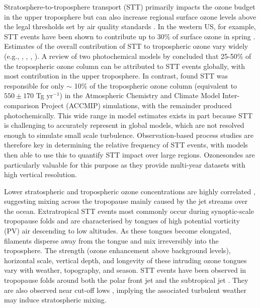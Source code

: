 Stratosphere-to-troposphere transport (STT) primarily impacts the ozone budget in the upper troposphere but can also increase regional surface ozone levels above the legal thresholds set by air quality standards \citep{Danielson1968, Lefohn2011, Langford2012, Zhang2014}.
In the western US, for example, STT events have been shown to contribute up to 30\% of surface ozone in spring \citep{Lin2012}.
Estimates of the overall contribution of STT to tropospheric ozone vary widely (e.g., \citep{Galani2003},  \citet{Stohl2003}, \citet{Stevenson2006}, \citet{Lefohn2011}).
A review of two photochemical models by \citet{Stohl2003} concluded that 25-50\% of the tropospheric ozone column can be attributed to STT events globally, with most contribution in the upper troposphere.
In contrast, \citet{Stevenson2006} found STT was responsible for only $\sim$ 10\% of the tropospheric ozone column (equivalent to $550\pm170$ Tg yr$^{-1}$) in the Atmospheric Chemistry and Climate Model Inter-comparison Project (ACCMIP) simulations, with the remainder produced photochemically.
This wide range in model estimates exists in part because STT is challenging to accurately represent in global models, which are not resolved enough to simulate small scale turbulence.
Observation-based process studies are therefore key in determining the relative frequency of STT events, with models then able to use this to quantify STT impact over large regions.
Ozonesondes are particularly valuable for this purpose as they provide multi-year datasets with high vertical resolution.

Lower stratospheric and tropospheric ozone concentrations are highly correlated \citep{Terao2008}, suggesting mixing across the tropopause mainly caused by the jet streams over the ocean.
Extratropical STT events most commonly occur during synoptic-scale tropopause folds \citep{Sprenger2003, Tang2012, Frey2015} and are characterised by tongues of high potential vorticity (PV) air descending to low altitudes.
As these tongues become elongated, filaments disperse away from the tongue and mix irreversibly into the troposphere.
The strength (ozone enhancement above background levels), horizontal scale, vertical depth, and longevity of these intruding ozone tongues vary with weather, topography, and season.
STT events have been observed in tropopause folds around both the polar front jet \citep{Vaughan1994, Beekmann1997} and the subtropical jet \citep{Baray2000}.
They are also observed near cut-off lows \citep{Price1993, Wirth1995}, implying the associated turbulent weather may induce stratospheric mixing.

